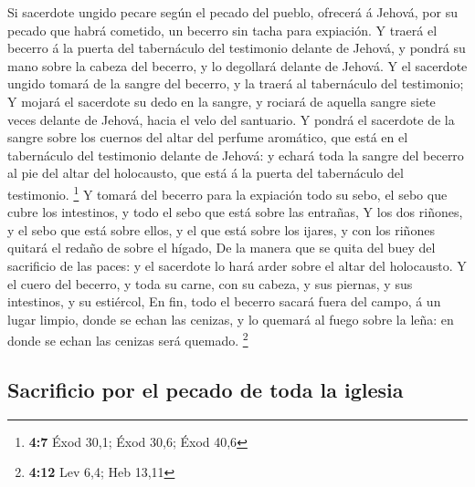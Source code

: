  Si sacerdote ungido pecare según el pecado del pueblo,
ofrecerá á Jehová, por su pecado que habrá cometido, un becerro sin
tacha para expiación.  Y traerá el becerro á la puerta del
tabernáculo del testimonio delante de Jehová, y pondrá su mano sobre la
cabeza del becerro, y lo degollará delante de Jehová.  Y
el sacerdote ungido tomará de la sangre del becerro, y la traerá al
tabernáculo del testimonio;  Y mojará el sacerdote su dedo
en la sangre, y rociará de aquella sangre siete veces delante de Jehová,
hacia el velo del santuario.  Y pondrá el sacerdote de la
sangre sobre los cuernos del altar del perfume aromático, que está en el
tabernáculo del testimonio delante de Jehová: y echará toda la sangre
del becerro al pie del altar del holocausto, que está á la puerta del
tabernáculo del testimonio. \footnote{\textbf{4:7} Éxod 30,1; Éxod 30,6;
  Éxod 40,6}  Y tomará del becerro para la expiación todo
su sebo, el sebo que cubre los intestinos, y todo el sebo que está sobre
las entrañas,  Y los dos riñones, y el sebo que está sobre
ellos, y el que está sobre los ijares, y con los riñones quitará el
redaño de sobre el hígado,  De la manera que se quita del
buey del sacrificio de las paces: y el sacerdote lo hará arder sobre el
altar del holocausto.  Y el cuero del becerro, y toda su
carne, con su cabeza, y sus piernas, y sus intestinos, y su estiércol,
 En fin, todo el becerro sacará fuera del campo, á un
lugar limpio, donde se echan las cenizas, y lo quemará al fuego sobre la
leña: en donde se echan las cenizas será quemado. \footnote{\textbf{4:12}
  Lev 6,4; Heb 13,11}

\hypertarget{sacrificio-por-el-pecado-de-toda-la-iglesia}{%
\subsection{Sacrificio por el pecado de toda la
iglesia}\label{sacrificio-por-el-pecado-de-toda-la-iglesia}}

